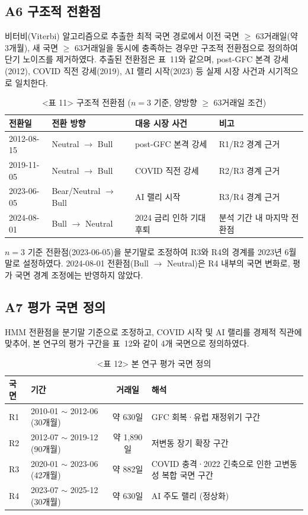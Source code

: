 \documentclass{article}
\begin{document}
\subsection*{A6 구조적 전환점}

비터비(Viterbi) 알고리즘으로 추출한 최적 국면 경로에서 이전 국면 $\geq$ 63거래일(약 3개월), 새 국면 $\geq$ 63거래일을 동시에 충족하는 경우만 구조적 전환점으로 정의하여 단기 노이즈를 제거하였다. 추출된 전환점은 표~11와 같으며, post-GFC 본격 강세(2012), COVID 직전 강세(2019), AI 랠리 시작(2023) 등 실제 시장 사건과 시기적으로 일치한다.

\begin{table}[ht]
\centering
\caption{<표 11> 구조적 전환점 ($n=3$ 기준, 양방향 $\geq$ 63거래일 조건)}
\label{tab:a1_breaks}
\begin{tabular}{llll}
\toprule
\textbf{전환일} & \textbf{전환 방향} & \textbf{대응 시장 사건} & \textbf{비고} \\
\midrule
2012-08-15 & Neutral $\rightarrow$ Bull & post-GFC 본격 강세      & R1/R2 경계 근거 \\
2019-11-05 & Neutral $\rightarrow$ Bull & COVID 직전 강세         & R2/R3 경계 근거 \\
2023-06-05 & Bear/Neutral $\rightarrow$ Bull & AI 랠리 시작       & R3/R4 경계 근거 \\
2024-08-01 & Bull $\rightarrow$ Neutral & 2024 금리 인하 기대 후퇴 & 분석 기간 내 마지막 전환점 \\
\bottomrule
\end{tabular}
\end{table}

$n = 3$ 기준 전환점(2023-06-05)을 분기말로 조정하여 R3와 R4의 경계를 2023년 6월 말로 설정하였다. 2024-08-01 전환점(Bull $\rightarrow$ Neutral)은 R4 내부의 국면 변화로, 평가 국면 경계 조정에는 반영하지 않았다.

\subsection*{A7 평가 국면 정의}

HMM 전환점을 분기말 기준으로 조정하고, COVID 시작 및 AI 랠리를 경제적 직관에 맞추어, 본 연구의 평가 구간을 표~12와 같이 4개 국면으로 정의하였다.

\begin{table}[ht]
\centering
\caption{<표 12> 본 연구 평가 국면 정의}
\label{tab:a1_regimes}
\begin{tabular}{llcl}
\toprule
\textbf{국면} & \textbf{기간} & \textbf{거래일} & \textbf{해석} \\
\midrule
R1 & 2010-01 $\sim$ 2012-06 (30개월) & 약 630일   & GFC 회복·유럽 재정위기 구간 \\
R2 & 2012-07 $\sim$ 2019-12 (90개월) & 약 1,890일 & 저변동 장기 확장 구간 \\
R3 & 2020-01 $\sim$ 2023-06 (42개월) & 약 882일   & COVID 충격·2022 긴축으로 인한 고변동성 복합 국면 구간 \\
R4 & 2023-07 $\sim$ 2025-12 (30개월) & 약 630일   & AI 주도 랠리 (정상화) \\
\bottomrule
\end{tabular}
\end{table}
\end{document}
